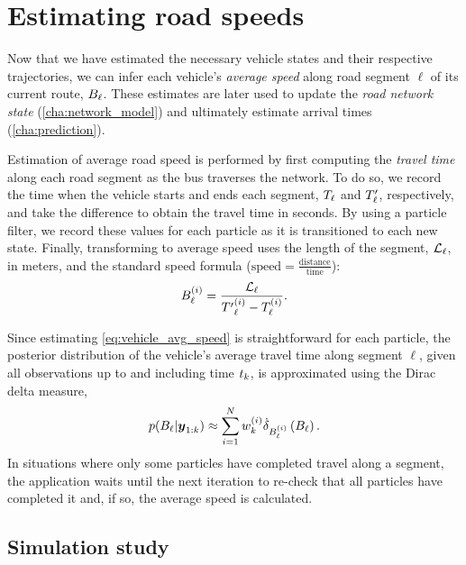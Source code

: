 \section{Estimating road speeds}
\label{sec:vehicle_speeds}

Now that we have estimated the necessary vehicle states and their respective trajectories, we can infer each vehicle's \emph{average speed} along road segment $\ell$ of its current route, $B_{\ell}$. These estimates are later used to update the \emph{road network state} (\cref{cha:network_model}) and ultimately estimate arrival times (\cref{cha:prediction}).


Estimation of average road speed is performed by first computing the \emph{travel time} along each road segment as the bus traverses the network. To do so, we record the time when the vehicle starts and ends each segment, $T_\ell$ and $T'_\ell$, respectively, and take the difference to obtain the travel time in seconds. By using a particle filter, we record these values for each particle as it is transitioned to each new state. Finally, transforming to average speed uses the length of the segment, $\mathcal{L}_\ell$, in meters, and the standard speed formula ($\text{speed} = \frac{\text{distance}}{\text{time}}$):
\begin{equation}
\label{eq:vehicle_avg_speed}
B^{(i)}_\ell = \frac{\mathcal{L}_\ell}{{T'}^{(i)}_\ell - {T}^{(i)}_\ell}.
\end{equation}


Since estimating \cref{eq:vehicle_avg_speed} is straightforward for each particle, the posterior distribution of the vehicle's average travel time along segment $\ell$, given all observations up to and including time $t_k$, is approximated using the Dirac delta measure,
\begin{equation}
\label{eq:pf_speed_dist}
p(B_\ell | \boldsymbol{y}_{1:k}) \approx
\sum_{i=1}^N w^{(i)}_k \dot\delta_{B^{(i)}_\ell}\left(B_\ell\right).
\end{equation}
In situations where only some particles have completed travel along a segment, the application waits until the next iteration to re-check that all particles have completed it and, if so, the average speed is calculated.


\subsection{Simulation study}
\label{eq:pf_simulation_study}

